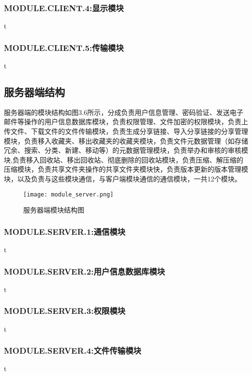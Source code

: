 \subsubsection{MODULE.CLIENT.4:显示模块}
t

\subsubsection{MODULE.CLIENT.5:传输模块}
t





\subsection{服务器端结构}
服务器端的模块结构如图3.6所示，分成负责用户信息管理、密码验证、发送电子邮件等操作的用户信息数据库模块，负责权限管理、文件加密的权限模块，负责上传文件、下载文件的文件传输模块，负责生成分享链接、导入分享链接的分享管理模块，负责移入收藏夹、移出收藏夹的收藏夹模块，负责文件元数据管理（如存储冗余、搜索、分类、新建、移动等）的元数据管理模块，负责举办和审核的审核模块,负责移入回收站、移出回收站、彻底删除的回收站模块，负责压缩、解压缩的压缩模块，负责共享文件夹操作的共享文件夹模块快，负责版本更新的版本管理模块，以及负责与这些模块通信，与客户端模块通信的通信模块，一共12个模块。

\begin{figure}[!h] 
\centering   
\texttt{[image: module\_server.png]}
\caption{服务器端模块结构图}\label{fig:noted-figure}
\end{figure}

\subsubsection{MODULE.SERVER.1:通信模块}
t

\subsubsection{MODULE.SERVER.2:用户信息数据库模块}
t

\subsubsection{MODULE.SERVER.3:权限模块}
t

\subsubsection{MODULE.SERVER.4:文件传输模块}
t

